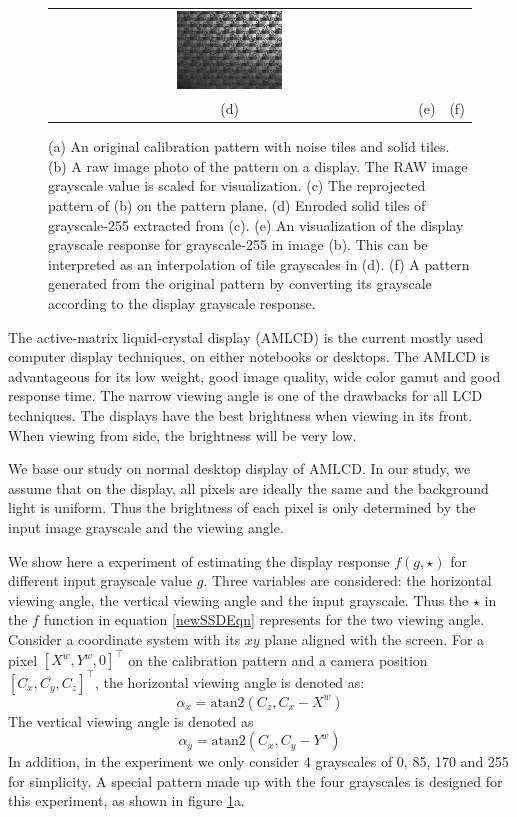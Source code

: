 \documentclass{report}
\begin{document}
\begin{figure}
\begin{tabular}{ccc}
\includegraphics[width=0.3\textwidth]{images/fitted-image.png}\\
(d)&(e)&(f)
\end{tabular}
\caption{(a) An original calibration pattern with noise tiles and solid tiles. (b) A raw image photo of the pattern on a display. The RAW image grayscale value is scaled for visualization. (c) The reprojected pattern of (b) on the pattern plane. (d) Enroded solid tiles of grayscale-255 extracted from (c). (e) An visualization of the display grayscale response for grayscale-255 in image (b). This can be interpreted as an interpolation of tile grayscales in (d). (f) A pattern generated from the original pattern by converting its grayscale according to the display grayscale response. }
\label{displayPattern}
\end{figure}

The active-matrix liquid-crystal display (AMLCD) is the current mostly used computer display techniques, on either notebooks or desktops. The AMLCD is advantageous for its low weight, good image quality, wide color gamut and good response time. The narrow viewing angle is one of the drawbacks for all LCD techniques. The displays have the best brightness when viewing in its front. When viewing from side, the brightness will be very low. 

We base our study on normal desktop display of AMLCD. In our study, we assume that on the display, all pixels are ideally the same and the background light is uniform. Thus the brightness of each pixel is only determined by the input image grayscale and the viewing angle. 

We show here a experiment of estimating the display response $f(g, \star)$ for different input grayscale value $g$. Three variables are considered: the horizontal viewing angle, the vertical viewing angle and the input grayscale. Thus the $\star$ in the $f$ function in equation \ref{newSSDEqn} represents for the two viewing angle. Consider a coordinate system with its $xy$ plane aligned with the screen. For a pixel $[X^w, Y^w, 0]^\top$ on the calibration pattern and a camera position $[C_x, C_y, C_z]^\top$, the horizontal viewing angle is denoted as: 
\begin{equation}
\alpha_x = \text{atan2}(C_z, C_x - X^w)
\end{equation} 
The vertical viewing angle is denoted as 
\begin{equation}
\alpha_y = \text{atan2}(C_x, C_y - Y^w)
\end{equation}
In addition, in the experiment we only consider 4 grayscales of 0, 85, 170 and 255 for simplicity. A special pattern made up with the four grayscales is designed for this experiment, as shown in figure \ref{displayPattern}a. 
\end{document}

